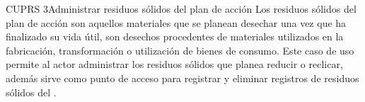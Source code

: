 
\begin{UseCase}{CUPRS 3}{Administrar residuos sólidos del plan de acción}
    {
	Los residuos sólidos del plan de acción son aquellos materiales que se planean desechar una vez que ha finalizado su vida útil, son desechos procedentes de materiales utilizados en la fabricación, transformación o utilización de bienes de consumo. 
	Este caso de uso permite al actor administrar los residuos sólidos que planea reducir o reclicar, además sirve como punto de acceso para registrar y eliminar registros de residuos sólidos del .
    }
    
    


\end{UseCase}
